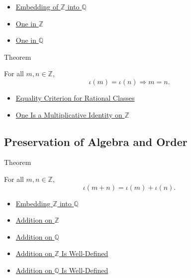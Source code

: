 \begin{dependencies}
\begin{itemize}
  \item \hyperref[def:rational-chapter-embedding-z-into-q]{Embedding of $\mathbb{Z}$ into $\mathbb{Q}$}
  \item \hyperref[def:one-in-z]{One in $\mathbb{Z}$}
  \item \hyperref[def:one-in-q]{One in $\mathbb{Q}$}
\end{itemize}
\end{dependencies}

\begin{theorembox}{Theorem}
\begin{theorem}
\label{thm:embedding-z-into-q-injective}
For all $m,n\in\mathbb{Z}$,
\[
\iota(m)=\iota(n)\Longrightarrow m=n.
\]
\end{theorem}
\end{theorembox}

\begin{dependencies}
\begin{itemize}
  \item \hyperref[prop:equality-criterion-for-rational-classes]{Equality Criterion for Rational Classes}
  \item \hyperref[thm:one-multiplicative-identity-on-z]{One Is a Multiplicative Identity on $\mathbb{Z}$}
\end{itemize}
\end{dependencies}

\subsection*{Preservation of Algebra and Order}

\begin{theorembox}{Theorem}
\begin{theorem}
\label{thm:embedding-z-into-q-preserves-addition}
For all $m,n\in\mathbb{Z}$,
\[
\iota(m+n)=\iota(m)+\iota(n).
\]
\end{theorem}
\end{theorembox}

\begin{dependencies}
\begin{itemize}
  \item \hyperref[def:rational-chapter-embedding-z-into-q]{Embedding $\mathbb{Z}$ into $\mathbb{Q}$}
  \item \hyperref[def:addition-on-z-classes]{Addition on $\mathbb{Z}$}
  \item \hyperref[def:addition-on-q-classes]{Addition on $\mathbb{Q}$}
  \item \hyperref[thm:addition-on-z-well-defined]{Addition on $\mathbb{Z}$ Is Well-Defined}
  \item \hyperref[thm:addition-on-q-well-defined]{Addition on $\mathbb{Q}$ Is Well-Defined}
\end{itemize}
\end{dependencies}

